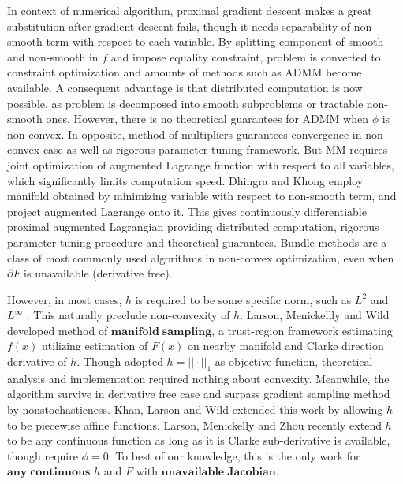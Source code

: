 \documentclass[10pt, oneside]{article}
\begin{document}
In context of numerical algorithm, proximal gradient descent \cite{proximal,accproximal} makes a great substitution after gradient descent fails, though it needs separability of non-smooth term with respect to each variable. By splitting component of smooth and non-smooth in $f$ and impose equality constraint, problem is converted to constraint optimization  and amounts of methods such as ADMM\cite{ADMM} become available. A consequent advantage is that distributed computation is now possible, as problem is decomposed into smooth subproblems or tractable non-smooth ones. However, there is no theoretical guarantees for ADMM when $\phi$ is non-convex. In opposite, method of multipliers \cite{MM} guarantees convergence in non-convex case as well as rigorous parameter tuning framework. But MM requires joint optimization of augmented Lagrange function with respect to all variables, which significantly limits computation speed. Dhingra and Khong\cite{proximalauglag} employ manifold obtained by minimizing variable with respect to non-smooth term, and project augmented Lagrange onto it. This gives continuously differentiable proximal augmented Lagrangian providing distributed computation, rigorous parameter tuning procedure and theoretical guarantees. Bundle methods \cite{bundle,bundle2,bundle3} are a class of most commonly used algorithms in non-convex optimization, even when $\partial F$ is unavailable (derivative free)\cite{bundlefree1,bundlefree2}. 
\par
However, in most cases, $h$ is required to be some specific norm, such as $L^2$ \cite{comp55} and $L^{\infty}$ \cite{comp44,comp56}. This naturally preclude non-convexity of $h$. Larson, Menickellly and Wild \cite{manifoldl1} developed method of $\mathbf{manifold\;sampling}$, a trust-region framework estimating $f(x)$ utilizing estimation of $F(x)$ on nearby manifold and Clarke direction derivative of $h$. Though adopted $h=||\cdot||_1$ as objective function, theoretical analysis and implementation required nothing about convexity. Meanwhile, the algorithm survive in derivative free case and surpass gradient sampling method \cite{grasam1,grasam2} by nonstochasticness. Khan, Larson and Wild \cite{manifoldpiecewiselinear} extended this work by allowing $h$ to be piecewise affine functions. Larson, Menickelly and Zhou \cite{manifold} recently extend $h$ to be any continuous function as long as it is  Clarke sub-derivative is available, though require $\phi=0$. To best of our knowledge, this is the only work for $\mathbf{any\;continuous} $ $h$ and $F$ with $\mathbf{unavailable \;Jacobian}$. 
\end{document}
